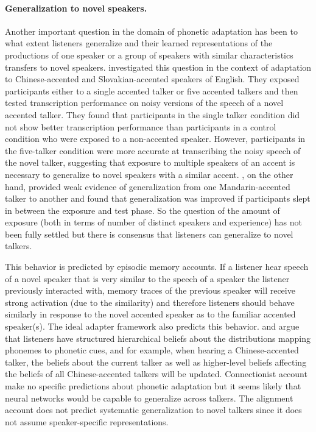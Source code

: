 \paragraph{Generalization to novel speakers.}  Another important question in the domain of phonetic adaptation has been
to what extent listeners generalize and  their learned representations  of the productions of one speaker or a group of speakers with similar 
characteristics transfers to novel speakers. \textcite{Bradlow2008} investigated this question in the context of adaptation to Chinese-accented and Slovakian-accented
speakers of English. They exposed participants either to a single accented talker or five accented talkers and then tested
transcription performance on noisy versions of the speech of a novel accented talker. They found that participants in the single talker condition
did not show better transcription performance than participants in a control condition who were exposed to a non-accented speaker. However, participants
in the five-talker condition were more accurate at transcribing the noisy speech of the novel talker, suggesting that exposure to multiple speakers of an accent is necessary
to generalize to novel speakers with a similar accent. \textcite{Xie2018}, on the other hand, provided weak evidence of generalization from one Mandarin-accented talker 
to another and found that generalization was improved if participants slept in between the exposure and test phase. So the question of the amount of exposure (both in terms of number
of distinct speakers and experience) has not been fully settled but there is consensus that listeners can generalize to novel talkers.

This behavior is predicted by episodic memory accounts. If a listener hear speech of a novel speaker that is very similar to the speech of a speaker the listener previously interacted with, 
memory traces of the previous speaker will receive strong activation (due to the similarity) and therefore listeners should behave similarly in response to the 
novel accented speaker as to the familiar accented speaker(s). The ideal adapter framework also predicts this behavior. \textcite{Kleinschmidt2015} and \textcite{Kleinschmidt2019} 
argue that listeners have structured hierarchical beliefs about the distributions mapping phonemes to phonetic cues, and for example, when hearing a Chinese-accented talker, 
the beliefs about the current talker as well as higher-level beliefs affecting the beliefs of all Chinese-accented talkers will be updated. Connectionist account make no specific predictions
about phonetic adaptation but it seems likely that neural networks would be capable to generalize across talkers. The alignment account does not predict systematic
generalization to novel talkers since it does not assume speaker-specific representations.


